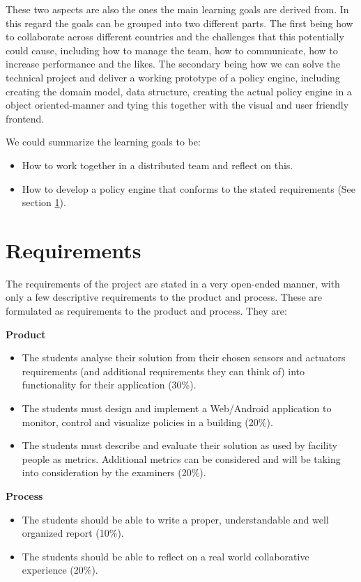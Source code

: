 These two aspects are also the ones the main learning goals are derived from. In this regard the goals can be grouped into two different parts. The first being how to collaborate across different countries and the challenges that this potentially could cause, including how to manage the team, how to communicate, how to increase performance and the likes. The secondary being how we can solve the technical project and deliver a working prototype of a policy engine, including creating the domain model, data structure, creating the actual policy engine in a object oriented-manner and tying this together with the visual and user friendly frontend.

We could summarize the learning goals to be: 
\begin{itemize}
\item How to work together in a distributed team and reflect on this.
\item How to develop a policy engine that conforms to the stated requirements (See section \ref{sec:requirements}).
\end{itemize}

\section{Requirements} \label{sec:requirements}
The requirements of the project are stated in a very open-ended manner, with only a few descriptive requirements to the product and process. These are formulated as requirements to the product and process. They are:

\textbf{Product}
\begin{itemize}
	\item The students analyse their solution from their chosen sensors and actuators requirements (and additional requirements they can think of) into functionality for their application (30\%).
	\item The students must design and implement a Web/Android application to monitor, control and visualize policies in a building (20\%).
	\item The students must describe and evaluate their solution as used by facility people as metrics. Additional metrics can be considered and will be taking into consideration by the examiners (20\%).
\end{itemize}

\textbf{Process}
\begin{itemize}
	\item The students should be able to write a proper, understandable and well organized report (10\%).
	\item The students should be able to reflect on a real world collaborative experience (20\%).
\end{itemize}